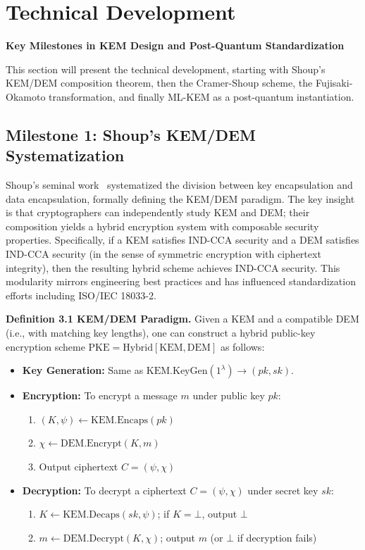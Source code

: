 \chapter{Technical Development}
\begin{center}
\large \textbf{Key Milestones in KEM Design and Post-Quantum Standardization}
\end{center}
\vspace{1em}

This section will present the technical development, starting with Shoup's KEM/DEM composition theorem, then the Cramer-Shoup scheme, the Fujisaki-Okamoto transformation, and finally ML-KEM as a post-quantum instantiation.

\section{Milestone 1: Shoup's KEM/DEM Systematization}

Shoup's seminal work~\cite{shoup2001proposal} systematized the division between key encapsulation and data encapsulation, formally defining the KEM/DEM paradigm. The key insight is that cryptographers can independently study KEM and DEM; their composition yields a hybrid encryption system with composable security properties. Specifically, if a KEM satisfies IND-CCA security and a DEM satisfies IND-CCA security (in the sense of symmetric encryption with ciphertext integrity), then the resulting hybrid scheme achieves IND-CCA security. This modularity mirrors engineering best practices and has influenced standardization efforts including ISO/IEC 18033-2.

\noindent\textbf{Definition 3.1 KEM/DEM Paradigm.} Given a KEM and a compatible DEM (i.e., with matching key lengths), one can construct a hybrid public-key encryption scheme $\text{PKE} = \text{Hybrid}[\text{KEM}, \text{DEM}]$ as follows:
\begin{itemize}
    \item \textbf{Key Generation:} Same as $\text{KEM.KeyGen}(1^\lambda) \to (pk, sk)$.
    \item \textbf{Encryption:} To encrypt a message $m$ under public key $pk$:
    \begin{enumerate}
        \item $(K, \psi) \gets \text{KEM.Encaps}(pk)$
        \item $\chi \gets \text{DEM.Encrypt}(K, m)$
        \item Output ciphertext $C = (\psi, \chi)$
    \end{enumerate}
    \item \textbf{Decryption:} To decrypt a ciphertext $C = (\psi, \chi)$ under secret key $sk$:
    \begin{enumerate}
        \item $K \gets \text{KEM.Decaps}(sk, \psi)$; if $K = \bot$, output $\bot$
        \item $m \gets \text{DEM.Decrypt}(K, \chi)$; output $m$ (or $\bot$ if decryption fails)
    \end{enumerate}
\end{itemize}

